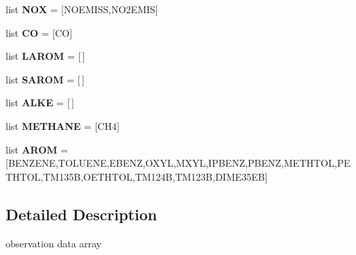 \begin{DoxyCompactItemize}
\item 
\mbox{\label{namespacefitobs_acb4147c03f041448aebf39e7fb2d2837}} 
list {\bfseries N\+OX} = \mbox{[}\textquotesingle{}N\+O\+E\+M\+I\+SS\textquotesingle{},\textquotesingle{}N\+O2\+E\+M\+IS\textquotesingle{}\mbox{]}
\item 
\mbox{\label{namespacefitobs_abee2a9c6e9b6b675345fc82175f7fef9}} 
list {\bfseries CO} = \mbox{[}\textquotesingle{}CO\textquotesingle{}\mbox{]}
\item 
\mbox{\label{namespacefitobs_a03f293cd55acf187e12ceb33b2ff5e7c}} 
list {\bfseries L\+A\+R\+OM} = \mbox{[}$\,$\mbox{]}
\item 
\mbox{\label{namespacefitobs_adf948be4bd868bc4368e3ff7161b51bf}} 
list {\bfseries S\+A\+R\+OM} = \mbox{[}$\,$\mbox{]}
\item 
\mbox{\label{namespacefitobs_ab6b7e3f1268bb88f88ddebcf07258b35}} 
list {\bfseries A\+L\+KE} = \mbox{[}$\,$\mbox{]}
\item 
\mbox{\label{namespacefitobs_adb0b5037f50ae76637b2c860372eabf5}} 
list {\bfseries M\+E\+T\+H\+A\+NE} = \mbox{[}\textquotesingle{}C\+H4\textquotesingle{}\mbox{]}
\item 
\mbox{\label{namespacefitobs_a187f3d4c2fd636969c4daedb84e9ad11}} 
list {\bfseries A\+R\+OM} = \mbox{[}\textquotesingle{}B\+E\+N\+Z\+E\+NE\textquotesingle{},\textquotesingle{}T\+O\+L\+U\+E\+NE\textquotesingle{},\textquotesingle{}E\+B\+E\+NZ\textquotesingle{},\textquotesingle{}O\+X\+YL\textquotesingle{},\textquotesingle{}M\+X\+YL\textquotesingle{},\textquotesingle{}I\+P\+B\+E\+NZ\textquotesingle{},\textquotesingle{}P\+B\+E\+NZ\textquotesingle{},\textquotesingle{}M\+E\+T\+H\+T\+OL\textquotesingle{},\textquotesingle{}P\+E\+T\+H\+T\+OL\textquotesingle{},\textquotesingle{}T\+M135B\textquotesingle{},\textquotesingle{}O\+E\+T\+H\+T\+OL\textquotesingle{},\textquotesingle{}T\+M124B\textquotesingle{},\textquotesingle{}T\+M123B\textquotesingle{},\textquotesingle{}D\+I\+M\+E35\+EB\textquotesingle{}\mbox{]}
\end{DoxyCompactItemize}


\subsection{Detailed Description}
\begin{DoxyVerb}observation data array \end{DoxyVerb}
 